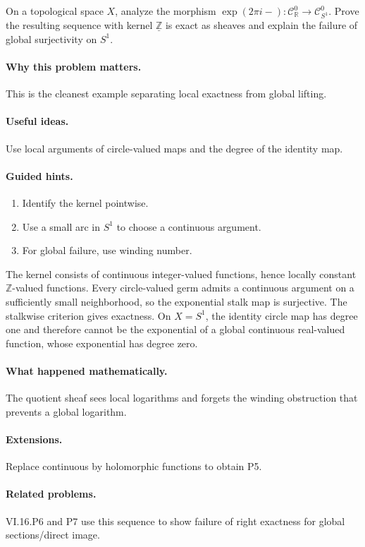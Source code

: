 \begin{problem}\label{prob:vi16-p04}
On a topological space $X$, analyze the morphism $\exp(2\pi i-):\mathcal C^0_{\mathbb R}\to\mathcal C^0_{S^1}$.  Prove the resulting sequence with kernel $\underline{\mathbb Z}$ is exact as sheaves and explain the failure of global surjectivity on $S^1$.
\end{problem}

\ifdefined\FullProblemDossiers
\paragraph{Why this problem matters.}
This is the cleanest example separating local exactness from global lifting.

\paragraph{Useful ideas.}
Use local arguments of circle-valued maps and the degree of the identity map.

\paragraph{Guided hints.}
\begin{enumerate}
\item Identify the kernel pointwise.
\item Use a small arc in $S^1$ to choose a continuous argument.
\item For global failure, use winding number.
\end{enumerate}

\begin{solution}
The kernel consists of continuous integer-valued functions, hence locally constant $\mathbb Z$-valued functions.  Every circle-valued germ admits a continuous argument on a sufficiently small neighborhood, so the exponential stalk map is surjective.  The stalkwise criterion gives exactness.  On $X=S^1$, the identity circle map has degree one and therefore cannot be the exponential of a global continuous real-valued function, whose exponential has degree zero.
\end{solution}

\paragraph{What happened mathematically.}
The quotient sheaf sees local logarithms and forgets the winding obstruction that prevents a global logarithm.

\paragraph{Extensions.}
Replace continuous by holomorphic functions to obtain P5.

\paragraph{Related problems.}
VI.16.P6 and P7 use this sequence to show failure of right exactness for global sections/direct image.
\fi

